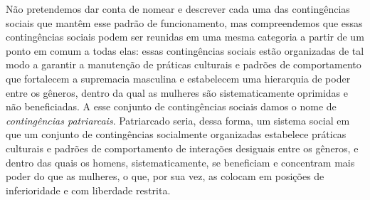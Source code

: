 Não pretendemos dar conta de nomear e descrever cada uma das contingências sociais que mantêm esse padrão de funcionamento, mas compreendemos que essas contingências sociais podem ser reunidas em uma mesma categoria a partir de um ponto em comum a todas elas: essas contingências sociais estão organizadas de tal modo a garantir a manutenção de práticas culturais e padrões de comportamento que fortalecem a supremacia masculina e estabelecem uma hierarquia de poder entre os gêneros, dentro da qual as mulheres são sistematicamente oprimidas e não beneficiadas. A esse conjunto de contingências sociais damos o nome de \textit{contingências patriarcais}. Patriarcado seria, dessa forma, um sistema social em que um conjunto de contingências socialmente organizadas estabelece práticas culturais e padrões de comportamento de interações desiguais entre os gêneros, e dentro das quais os homens, sistematicamente, se beneficiam e concentram mais poder do que as mulheres, o que, por sua vez, as colocam em posições de inferioridade e com liberdade restrita. 

